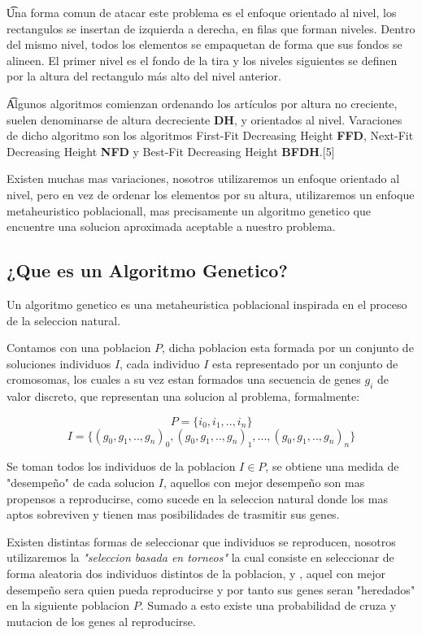 \documentclass[10pt]{article}
\begin{document}
\t Una forma comun de atacar este problema es el enfoque orientado al nivel, los rectangulos se insertan de izquierda a derecha, en filas que forman niveles. Dentro del mismo nivel, todos los elementos se empaquetan de forma que sus fondos se alineen. El primer nivel es el fondo de la tira y los niveles siguientes se definen por la altura del rectangulo más alto del nivel anterior.
 
\t Algunos algoritmos comienzan ordenando los artículos por altura no creciente, suelen denominarse de altura decreciente \textbf{DH}, y orientados al nivel. Varaciones de dicho algoritmo son los algoritmos First-Fit Decreasing Height \textbf{FFD}, Next-Fit Decreasing Height \textbf{NFD} y Best-Fit Decreasing Height \textbf{BFDH}.[5]

Existen muchas mas variaciones, nosotros utilizaremos un enfoque orientado al nivel, pero en vez de ordenar los elementos por su altura, utilizaremos un enfoque metaheuristico poblacionall, mas precisamente un algoritmo genetico que encuentre una solucion aproximada aceptable a nuestro problema.

\subsection{¿Que es un Algoritmo Genetico?}

Un algoritmo genetico es una metaheuristica poblacional inspirada en el proceso de la seleccion natural.

Contamos con una poblacion $P$, dicha poblacion esta formada por un conjunto de soluciones individuos $I$, cada individuo $I$ esta representado por un conjunto de cromosomas, los cuales a su vez estan formados una secuencia de genes $g_i$ de valor discreto, que representan una solucion al problema, formalmente:

$$P =\{i_0,i_1,..,i_n\}$$
$$I =\{(g_0,g_1,..,g_n)_0,(g_0,g_1,..,g_n)_1,...,(g_0,g_1,..,g_n)_n\}$$

Se toman todos los individuos de la poblacion $I \in P$, se obtiene una medida de "desempeño" de cada solucion $I$, aquellos con mejor desempeño son mas propensos a reproducirse, como sucede en la seleccion natural donde los mas aptos sobreviven y tienen mas posibilidades de trasmitir sus genes.

Existen distintas formas de seleccionar que individuos se reproducen, nosotros utilizaremos la \textit{"seleccion basada en torneos"} la cual consiste en seleccionar de forma aleatoria dos individuos distintos de la poblacion, y , aquel con mejor desempeño sera quien pueda reproducirse y por tanto sus genes seran "heredados" en la siguiente poblacion $P$. Sumado a esto existe una probabilidad de cruza y mutacion de los genes al reproducirse.
\end{document}
